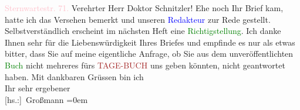            \pstart
           \noindent{}\raggedleft{}\textcolor{pink}{Sternwartestr. 71.}{}\ledrightnote{\textcolor{pink}{Sternwartestraße}}\pend
           \pstart{}Verehrter Herr Doktor Schnitzler!\pend\pstart
           Ehe noch Ihr Brief kam, hatte ich das Versehen bemerkt und unseren \textcolor{blue}{Redakteur}{} zur Rede gestellt.
               Selbstverständlich erscheint im nächsten Heft eine \textcolor{green}{Richtigstellung}{}.\pend
           \pstart
           Ich danke Ihnen sehr für die Liebenswürdigkeit Ihres Briefes und empfinde es nur als
               etwas bitter, dass Sie auf meine eigentliche Anfrage, ob Sie aus dem
               unveröffentlichten \textcolor{green}{Buch}{} nicht
               mehreres fürs \textcolor{brown}{TAGE-BUCH}{}\ledrightnote{\textcolor{brown}{Das Tage-Buch}} uns geben könnten, nicht geantwortet haben.\pend
           \pstart
           Mit dankbaren Grüssen bin ich{\\[\baselineskip]}Ihr sehr ergebener{\\[\baselineskip]}\spacefill\mbox{{[}hs.:{]} Großmann}\pend
           \leftskip=0em{}\endnumbering{}  
      